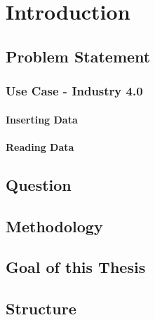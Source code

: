 \chapter{Introduction}
\label{ch:Introduction}

\section{Problem Statement\label{se:problemStatement}}

\subsection{Use Case - Industry 4.0\label{subse:useCaseIndustry4.0}}

\subsubsection{Inserting Data\label{subse:insertingData}}

\subsubsection{Reading Data\label{subse:readingData}}

\section{Question\label{se:question}}

\section{Methodology\label{se:methodology}}

\section{Goal of this Thesis\label{se:goalOfThisThesis}}

\section{Structure\label{se:structure}}
